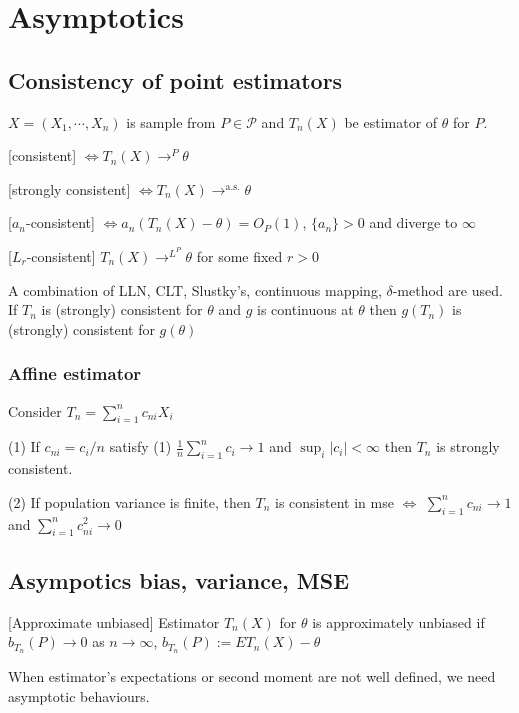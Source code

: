 \section{Asymptotics}

\subsection{Consistency of point estimators}

$X=(X_1, \cdots, X_n)$ is sample from $P\in\mathcal{P}$ and $T_n(X)$ be estimator of $\theta$ for $P$.

[consistent] $\Leftrightarrow T_n(X)\rightarrow^P \theta$ 

[strongly consistent] $\Leftrightarrow T_n(X)\rightarrow^{\text{a.s.}}\theta$ 

[$a_n$-consistent] $\Leftrightarrow a_n(T_n(X) - \theta) = O_P(1)$, $\{a_n\} > 0$ and diverge to $\infty$

[$L_r$-consistent] $T_n(X)\rightarrow^{L^P}\theta$ for some fixed $r > 0$

A combination of LLN, CLT, Slustky's, continuous mapping, $\delta$-method are used. If $T_n$ is (strongly) consistent for $\theta$ and $g$ is continuous at $\theta$ then $g(T_n)$ is (strongly) consistent for $g(\theta)$

\subsubsection{Affine estimator}

Consider $T_n=\sum_{i=1}^nc_{ni}X_i$

(1) If $c_{ni}=c_i/n$ satisfy (1) $\frac{1}{n}\sum_{i=1}^n c_i \rightarrow 1$ and $\sup_i |c_i|<\infty$ then $T_n$ is strongly consistent.

(2) If population variance is finite, then $T_n$ is consistent in mse $\Leftrightarrow$ $\sum_{i=1}^nc_{ni}\rightarrow 1$ and $\sum_{i=1}^n c_{ni}^2\rightarrow 0$

\subsection{Asympotics bias, variance, MSE}

[Approximate unbiased] Estimator $T_n(X)$ for $\theta$ is approximately unbiased if $b_{T_n}(P)\rightarrow 0$ as $n\rightarrow \infty$, $b_{T_n}(P) := ET_n(X)-\theta$

\pline
When estimator's expectations or second moment are not well defined, we need asymptotic behaviours.

